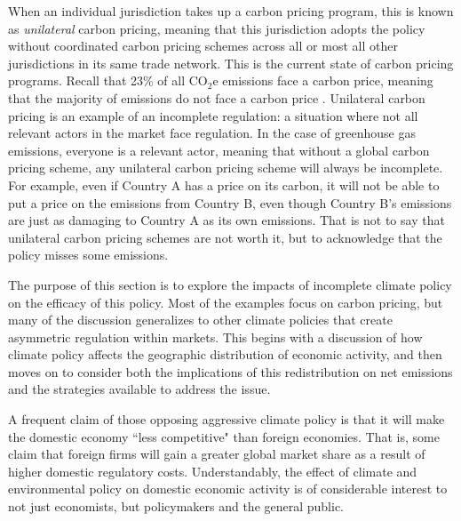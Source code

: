 When an individual jurisdiction takes up a carbon pricing program, this is known as \emph{unilateral} carbon pricing, meaning that this jurisdiction adopts the policy without coordinated carbon pricing schemes across all or most all other jurisdictions in its same trade network. This is the current state of carbon pricing programs. Recall that 23\% of all CO$_2$e emissions face a carbon price, meaning that the majority of emissions do not face a carbon price \citep{wbank}. Unilateral carbon pricing is an example of an incomplete regulation: a situation where not all relevant actors in the market face regulation. In the case of greenhouse gas emissions, everyone is a relevant actor, meaning that without a global carbon pricing scheme, any unilateral carbon pricing scheme will always be incomplete. For example, even if Country A has a price on its carbon, it will not be able to put a price on the emissions from Country B, even though Country B's emissions are just as damaging to Country A as its own emissions. That is not to say that unilateral carbon pricing schemes are not worth it, but to acknowledge that the policy misses some emissions. 

The purpose of this section is to explore the impacts of incomplete climate policy on the efficacy of this policy. Most of the examples focus on carbon pricing, but many of the discussion generalizes to other climate policies that create asymmetric regulation within markets. This begins with a discussion of how climate policy affects the geographic distribution of economic activity, and then moves on to consider both the implications of this redistribution on net emissions and the strategies available to address the issue.

A frequent claim of those opposing aggressive climate policy is that it will make the domestic economy ``less competitive" than foreign economies. That is, some claim that foreign firms will gain a greater global market share as a result of higher domestic regulatory costs. Understandably, the effect of climate and environmental policy on domestic economic activity is of considerable interest to not just economists, but policymakers and the general public.

